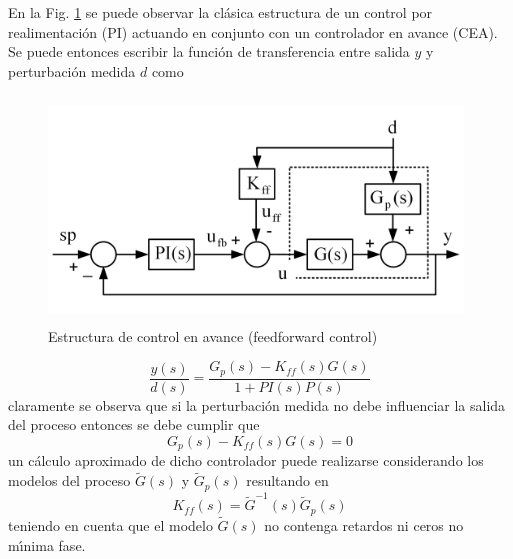 En la Fig. \ref{fa2} se puede observar la cl{\'a}sica estructura de un control por realimentaci{\'o}n (PI) actuando
en conjunto con un controlador en avance (CEA). Se puede entonces escribir la funci{\'o}n de transferencia entre
salida $y$ y  perturbaci{\'o}n medida $d$ como
\begin{figure}[t]
\centering
\includegraphics[width=11cm,height=6cm]{Appendix/fa2}
\caption{Estructura de control en avance (feedforward control)} \label{fa2}
\end{figure}
\begin{equation}
   \frac{y(s)}{d(s)}=\frac{G_p(s)-K_{ff}(s)G(s)}{1+PI(s)P(s)}
\end{equation}
claramente se observa que si la perturbaci{\'o}n medida no debe influenciar la salida del proceso entonces se
debe cumplir que
\begin{equation}
   G_p(s)-K_{ff}(s)G(s)=0
\end{equation}
un c{\'a}lculo aproximado de dicho controlador puede realizarse considerando los modelos del proceso
$\tilde{G}(s)$ y $\tilde{G}_p(s)$ resultando en
\begin{equation}
   K_{ff}(s)=\tilde{G}^{-1}(s)\tilde{G}_p(s)
\end{equation}
teniendo en cuenta que el modelo $\tilde{G}(s)$ no contenga retardos ni ceros no m{\'\i}nima fase.
